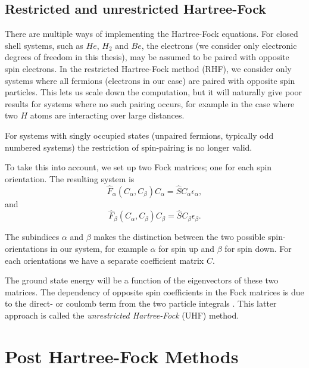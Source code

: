 \subsection{Restricted and unrestricted Hartree-Fock}

There are multiple ways of implementing the Hartree-Fock
equations. For closed shell systems, such as $He$, $H_2$ and $Be$, the
electrons (we consider only electronic degrees of freedom in this thesis), may be assumed to be paired with
opposite spin electrons. In the restricted Hartree-Fock method (RHF),
we consider only systems where all fermions (electrons in our case) are paired with opposite
spin particles. This lets us scale down the computation, but it will
naturally give poor results for systems where no such pairing occurs,
for example in the case where two $H$ atoms are interacting over
large distances.

For systems with singly occupied states (unpaired fermions, typically
odd numbered systems) the restriction of spin-pairing is no longer valid.

To take this into account, we set up two Fock matrices; one for each
spin orientation. The resulting system is
\begin{equation}
\hat{F}_\alpha(C_\alpha, C_\beta) C_\alpha = \hat{S} C_\alpha \epsilon_\alpha,
\end{equation}
and
\begin{equation}
\hat{F}_\beta(C_\alpha, C_\beta) C_\beta = \hat{S} C_\beta \epsilon_\beta.
\end{equation}

The subindices $\alpha$ and $\beta$ makes the distinction between the two possible spin-orientations in our system, for example $\alpha$ for spin up and $\beta$ for spin down. For each orientations we have a separate coefficient matrix $C$.

The ground state energy will be a function of the eigenvectors of
these two matrices. The dependency of opposite spin coefficients in
the Fock matrices is due to the direct- or coulomb term from the two
particle integrals \cite[p.241]{Szabo}. This latter approach is called
the \emph{unrestricted Hartree-Fock} (UHF) method.



\section{Post Hartree-Fock Methods}

